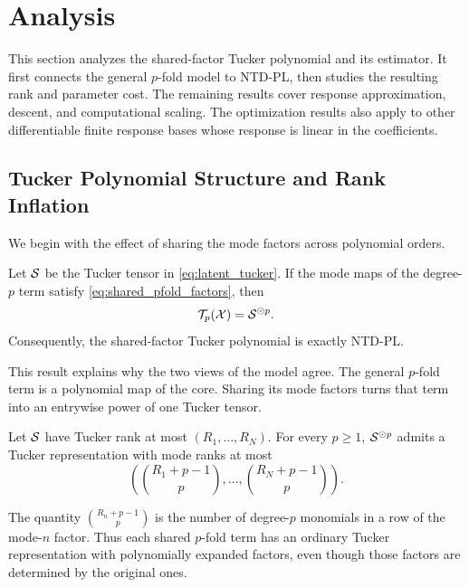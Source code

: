 \section{Analysis}
\label{sec:theory}

This section analyzes the shared-factor Tucker polynomial and its estimator. It
first connects the general $p$-fold model to NTD-PL, then studies the resulting
rank and parameter cost. The remaining results cover response approximation,
descent, and computational scaling. The optimization results also apply to
other differentiable finite response bases whose response is linear in the
coefficients.

\subsection{Tucker Polynomial Structure and Rank Inflation}

We begin with the effect of sharing the mode factors across polynomial orders.

\begin{proposition}
\label{prop:shared_pfold}
Let $\mathcal{S}$ be the Tucker tensor in \eqref{eq:latent_tucker}. If the mode maps of
the degree-$p$ term satisfy \eqref{eq:shared_pfold_factors}, then
\begin{equation}
  \mathcal{T}_p(\mathcal{X})=\mathcal{S}^{\odot p}.
\end{equation}
Consequently, the shared-factor Tucker polynomial is exactly NTD-PL.
\end{proposition}

This result explains why the two views of the model agree. The general
$p$-fold term is a polynomial map of the core. Sharing its mode factors turns
that term into an entrywise power of one Tucker tensor.

\begin{proposition}
\label{prop:rank_inflation}
Let $\mathcal{S}$ have Tucker rank at most $(R_1,\ldots,R_N)$. For every $p \ge 1$,
$\mathcal{S}^{\odot p}$ admits a Tucker representation with mode ranks at most
\begin{equation}
  \left(
  \binom{R_1+p-1}{p},\ldots,\binom{R_N+p-1}{p}
  \right).
\end{equation}
\end{proposition}

The quantity $\binom{R_n+p-1}{p}$ is the number of degree-$p$ monomials in a
row of the mode-$n$ factor. Thus each shared $p$-fold term has an ordinary
Tucker representation with polynomially expanded factors, even though those
factors are determined by the original ones.

